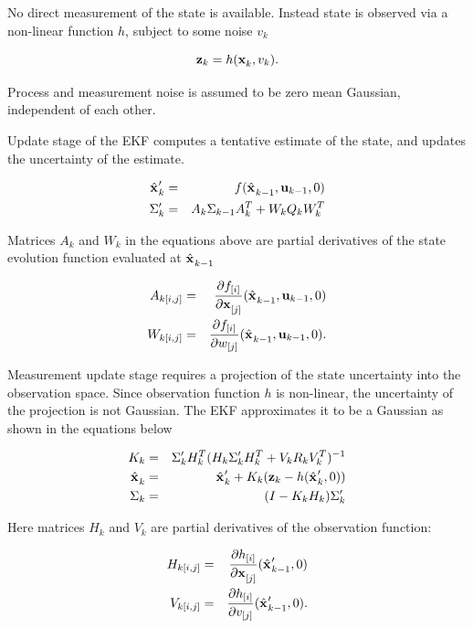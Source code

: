 No direct measurement of the state is available. Instead state is
observed via a non-linear function $h$, subject to some noise $v_k$

\begin{equation}
   \z{k} = h (\x{k}{}{}, v_k).
\end{equation}

Process and measurement noise is assumed to be zero mean Gaussian,
independent of each other.

Update stage of the EKF computes a tentative estimate of the state,
and updates the uncertainty of the estimate.

\begin{eqnarray}
\label{eqn:ekf_x_u}
\hat{\x{}{}{}}_k^\prime &=& f(\hat{\x{}{}{}}_{k-1},\U{k-1},0)\\
\label{eqn:ekf_sigma_u}
\Sigma_k^\prime &=& A_k \Sigma_{k-1} A_k^T + W_k Q_{k} W_k^T
\end{eqnarray}

Matrices $A_k$ and $W_k$ in the equations above are partial
derivatives of the state evolution function evaluated at
$\hat{\x{}{}{}}_{k-1}$

\begin{eqnarray}
A_{k[i,j]} &=& \frac{\partial f_{[i]}}{\partial \x{[j]}{}{}}
              (\hat{\x{}{}{}}_{k-1}, \U{k-1}, 0) \\
W_{k[i,j]} &=& \frac{\partial f_{[i]}}{\partial w_{[j]}}
              (\hat{\x{}{}{}}_{k-1}, \U{k-1}, 0).
\end{eqnarray}


Measurement update stage requires a projection of the state
uncertainty into the observation space. Since observation function $h$
is non-linear, the uncertainty of the projection is not Gaussian. The
EKF approximates it to be a Gaussian as shown in the equations below

\begin{eqnarray}
\label{eqn:ekf_gain}
K_k &=& \Sigma_k^\prime H_k^T(H_k\Sigma_k^\prime H_k^T + V_k R_k
V_k^T)^{-1}\\
\label{eqn:ekf_x_obs}
\hat{\x{}{}{}}_k &=& \hat{\x{}{}{}}_k^\prime + 
                      K_k (\z{k} - h(\hat{\x{}{}{}}_k^\prime,0))\\
\label{eqn:ekf_sigma_obs}
\Sigma_k &=& (I - K_k H_k) \Sigma_k^\prime
\end{eqnarray}

Here matrices $H_k$ and $V_k$ are partial derivatives of the
observation function:

\begin{eqnarray}
H_{k[i,j]} &=& \frac{\partial h_{[i]}}{\partial \x{[j]}{}{}}
              (\hat{\x{}{}{}}_{k-1}^\prime, 0)\\
V_{k[i,j]} &=& \frac{\partial h_{[i]}}{\partial v_{[j]}}
              (\hat{\x{}{}{}}_{k-1}^\prime, 0).
\end{eqnarray}



